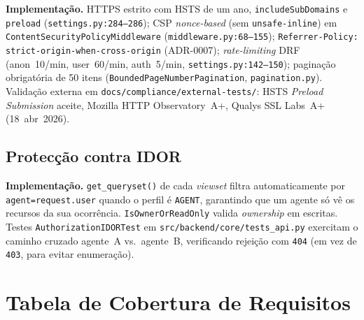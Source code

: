 \documentclass[a4paper,11pt]{article}
\begin{document}
\textbf{Implementação.} HTTPS estrito com HSTS de um ano,
\texttt{includeSubDomains} e \texttt{preload}
(\texttt{settings.py:284--286}); CSP \emph{nonce-based} (sem
\texttt{unsafe-inline}) em
\texttt{ContentSecurityPolicyMiddleware}
(\texttt{middleware.py:68--155}); \texttt{Referrer-Policy:
strict-origin-when-cross-origin} (ADR-0007); \emph{rate-limiting}
DRF (anon~10/min, user~60/min, auth~5/min,
\texttt{settings.py:142--150}); paginação obrigatória de 50 itens
(\texttt{BoundedPageNumberPagination}, \texttt{pagination.py}).
Validação externa em
\texttt{docs/compliance/external-tests/}: HSTS \emph{Preload Submission}
aceite, Mozilla HTTP Observatory~A+, Qualys SSL Labs~A+
(18~abr~2026).

\subsection*{Protecção contra IDOR}

\textbf{Implementação.} \texttt{get\_queryset()} de cada \emph{viewset}
filtra automaticamente por \texttt{agent=request.user} quando o perfil
é \texttt{AGENT}, garantindo que um agente só vê os recursos da sua
ocorrência. \texttt{IsOwnerOrReadOnly} valida \emph{ownership} em
escritas. Testes \texttt{AuthorizationIDORTest} em
\texttt{src/backend/core/tests\_api.py} exercitam o caminho cruzado
agente~A vs.\ agente~B, verificando rejeição com \texttt{404}
(em vez de \texttt{403}, para evitar enumeração).

\section{Tabela de Cobertura de Requisitos}
\end{document}
